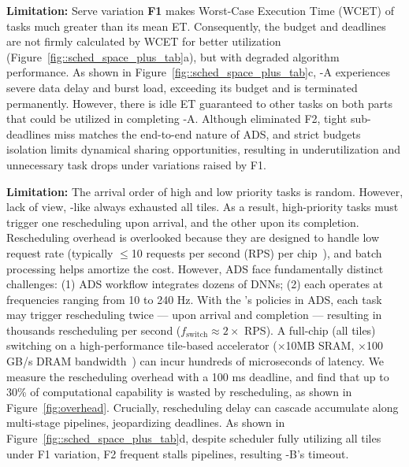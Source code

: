 \textbf{Limitation:} 
Serve variation {\bf F1} makes Worst-Case Execution Time (WCET) of tasks much greater than its mean ET. 
Consequently, the budget and deadlines are not firmly calculated by WCET for better utilization (Figure~\ref{fig::sched_space_plus_tab}a), but with degraded algorithm performance. 
As shown in Figure~\ref{fig::sched_space_plus_tab}c, {\singlefunc-A} experiences severe data delay and burst load, exceeding its budget and is terminated permanently. However, there is idle ET guaranteed to other tasks on both parts that could be utilized in completing \singlefunc-A. 
Although eliminated F2, tight sub-deadlines miss matches the end-to-end nature of ADS, and strict budgets isolation limits dynamical sharing opportunities, resulting in underutilization and unnecessary task drops under variations raised by F1. 

\textbf{Limitation: } 
The arrival order of high and low priority tasks is random. 
However, lack of \ETEs view, \AbbrCallout{\TpFirstName}-like always exhausted all tiles.  
As a result, high-priority tasks must trigger one rescheduling upon arrival, and the other upon its completion.  
Rescheduling overhead is overlooked because they are designed to handle low request rate (typically $\leq$10 requests per second (RPS) per chip~\cite{Jiang2018a-Mainstream}), and batch processing helps amortize the cost. However, ADS face fundamentally distinct challenges: (1) ADS workflow integrates dozens of DNNs; (2) each operates at frequencies ranging from 10 to 240 Hz. With the \AbbrCallout{\TpFirstName}'s policies in ADS, each task may trigger rescheduling twice --- upon arrival and completion --- resulting in thousands rescheduling per second ($f_{\text{switch}} \approx 2 \times$ RPS). 
A full-chip (all tiles) switching on a high-performance tile-based accelerator ($\times$10MB SRAM, $\times$100 GB/s DRAM bandwidth~\cite{Tenstorrent-2023}) can incur hundreds of microseconds of latency. 
We measure the rescheduling overhead with a 100 ms \ETEs deadline, and find that up to 30\% of computational capability is wasted by rescheduling, as shown in Figure~\ref{fig:overhead}.
Crucially, rescheduling delay can cascade accumulate along multi-stage pipelines, jeopardizing \ETEs deadlines. 
As shown in Figure~\ref{fig::sched_space_plus_tab}d, despite scheduler fully utilizing all tiles under F1 variation, F2 frequent stalls \ETEs pipelines, resulting \singlefunc-B's timeout. 


